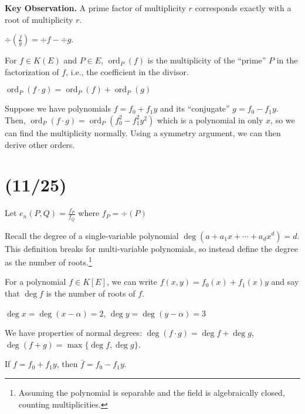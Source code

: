 \documentclass[notes]{agony}
\newcommand{\ord}{\operatorname{ord}}
\begin{document}
\textbf{Key Observation.} A prime factor of multiplicity $r$
corresponds exactly with a root of multiplicity $r$.

\begin{defn}
  $\div(\frac{f}{g}) = \div f - \div g$.
\end{defn}

\begin{defn}
  For $f \in K(E)$ and $P \in E$,
  $\ord_P(f)$ is the multiplicity of the ``prime'' $P$ in the factorization of $f$,
  i.e., the coefficient in the divisor.
\end{defn}

\begin{theorem}
  $\ord_P(f \cdot g) = \ord_P(f) + \ord_P(g)$
\end{theorem}

Suppose we have polynomials $f = f_0 + f_1 y$ and its ``conjugate'' $g = f_0 - f_1 y$.
Then, $\ord_P(f \cdot g) = \ord_P(f_0^2 - f_1^2 y^2)$
which is a polynomial in only $x$,
so we can find the multiplicity normally.
Using a symmetry argument, we can then derive other orders.

\section{(11/25)}

Let $e_n(P, Q) = \frac{f_P}{f_Q}$ where $f_P = \div(P)$

Recall the degree of a single-variable polynomial $\deg(a + a_1 x + \dotsb + a_d x^d) = d$.
This definition breaks for multi-variable polynomials,
so instead define the degree as the number of roots.\footnote{Assuming the polynomial is separable and the field is algebraically closed, counting multiplicities.}

For a polynomial $f \in K[E]$, we can \Wlog write $f(x,y) = f_0(x) + f_1(x)y$
and say that $\deg f$ is the number of roots of $f$.

\begin{example}
  $\deg x = \deg (x-\alpha) = 2$,
  $\deg y = \deg (y-\alpha) = 3$
\end{example}

We have properties of normal degrees:
$\deg(f \cdot g) = \deg f + \deg g$, $\deg(f+g) = \max\{\deg f, \deg g\}$.

\begin{defn}[conjugation]
  If $f = f_0 + f_1y$, then $\bar f = f_0 - f_1y$.
\end{defn}
\end{document}
